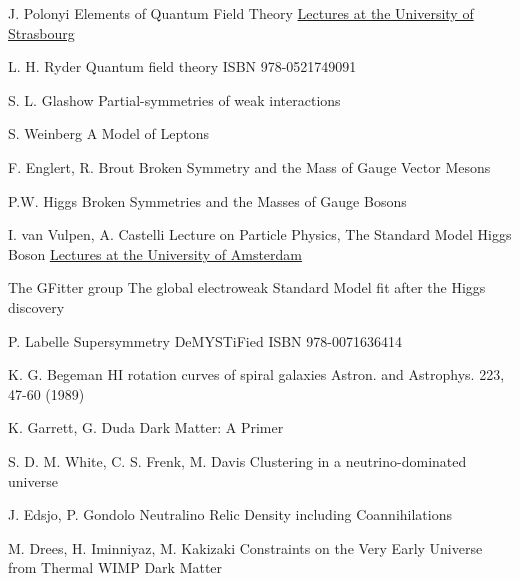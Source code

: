 

\begin{thebibliography}{2}


\singlespace

{J. Polonyi}
{Elements of Quantum Field Theory}
{\href{http://www-physique.u-strasbg.fr/~polonyi/}{Lectures at the University of Strasbourg}}

{L. H. Ryder}
{Quantum field theory}
{ISBN 978-0521749091}

{S. L. Glashow}
{Partial-symmetries of weak interactions}
{}

{S. Weinberg}
{A Model of Leptons}
{}

{F. Englert, R. Brout}
{Broken Symmetry and the Mass of Gauge Vector Mesons}
{}

{P.W. Higgs}
{ Broken Symmetries and the Masses of Gauge Bosons}
{}

             {I. van Vulpen, A. Castelli}
             {Lecture on Particle Physics, The Standard Model Higgs Boson}
             {\href{http://www.nikhef.nl/~ivov/Ivo_teaching.html}{Lectures at the University of Amsterdam}}

{The GFitter group}
{The global electroweak Standard Model fit after the Higgs discovery}
{}

{P. Labelle}
{Supersymmetry DeMYSTiFied}
{ISBN 978-0071636414}

{K. G. Begeman}
{HI rotation curves of spiral galaxies}
{Astron. and Astrophys. 223, 47-60 (1989)}

{K. Garrett, G. Duda}
{Dark Matter: A Primer}
{}

{S. D. M. White, C. S. Frenk, M. Davis}
{Clustering in a neutrino-dominated universe}
{}

{J. Edsjo, P. Gondolo}
{Neutralino Relic Density including Coannihilations}
{}

{M. Drees, H. Iminniyaz, M. Kakizaki}
{Constraints on the Very Early Universe from Thermal WIMP Dark Matter}
{}


\end{thebibliography}
